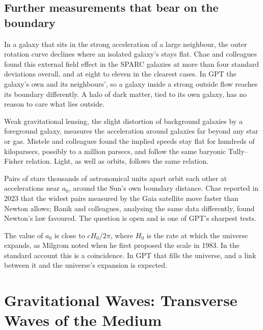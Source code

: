 \documentclass[11pt,a4paper]{article}
\begin{document}
\subsection{Further measurements that bear on the boundary}

 In a galaxy that sits in the strong acceleration of a large neighbour, the outer rotation curve declines where an isolated galaxy's stays flat. Chae and colleagues found this external field effect in the SPARC galaxies at more than four standard deviations overall, and at eight to eleven in the clearest cases. In GPT  the galaxy's own and its neighbours', so a galaxy inside a strong outside flow reaches its boundary differently. A halo of dark matter, tied to its own galaxy, has no reason to care what lies outside.

 Weak gravitational lensing, the slight distortion of background galaxies by a foreground galaxy, measures the acceleration around galaxies far beyond any star or gas. Mistele and colleagues found the implied speeds stay flat for hundreds of kiloparsecs, possibly to a million parsecs, and follow the same baryonic Tully--Fisher relation. Light, as well as orbits, follows the same relation.

 Pairs of stars thousands of astronomical units apart orbit each other at accelerations near $a_0$, around the Sun's own boundary distance. Chae reported in 2023 that the widest pairs measured by the Gaia satellite move faster than Newton allows; Banik and colleagues, analysing the same data differently, found Newton's law favoured. The question is open and is one of GPT's sharpest tests.

 The value of $a_0$ is close to $cH_0/2\pi$, where $H_0$ is the rate at which the universe expands, as Milgrom noted when he first proposed the scale in 1983. In the standard account this is a coincidence. In GPT  that fills the universe, and a link between it and the universe's expansion is expected.

\section{Gravitational Waves: Transverse Waves of the Medium}
\end{document}
